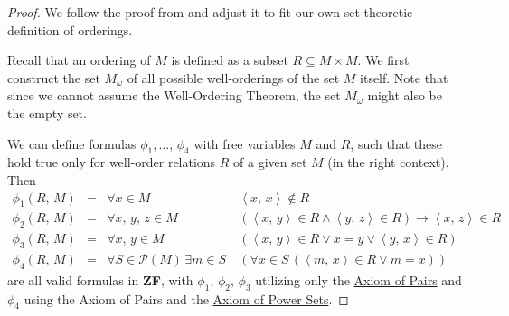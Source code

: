 \documentclass[../../main.tex]{subfiles}
\begin{document}
\begin{proof}
    We follow the proof from \cite{Har15} and adjust it to fit our own set-theoretic definition of orderings.

    Recall that an ordering of $M$ is defined as a subset $R \subseteq M \times M$.
    We first construct the set $M_\omega$ of all possible well-orderings of the set $M$ itself.
    Note that since we cannot assume the Well-Ordering Theorem, the set $M_\omega$ might also be the empty set.

    We can define formulas $\phi_1,\ldots,\, \phi_4$ with free variables $M$ and $R$, 
    such that these hold true only for well-order relations $R$ of a given set $M$ (in the right context).
    Then
    \begin{align*}
        \phi_1(R,\, M) &=& \forall x \in M \           & \left<x,\, x\right> \not\in R \\
        \phi_2(R,\, M) &=& \forall x,\, y,\, z \in M \ & \left(\left<x,\, y\right> \in R \wedge \left<y,\, z\right> \in R\right) \rightarrow \left<x,\, z\right> \in R \\
        \phi_3(R,\, M) &=& \forall x,\, y \in M \      & \left(\left<x,\, y\right> \in R \vee x = y \vee \left<y,\, x\right> \in R\right)\\
        \phi_4(R,\, M) &=& \forall S \in \mathcal{P}(M)\, \exists m \in S \
                         & \left(\forall x \in S\, \left(\left<m,\, x\right> \in R \vee m = x\right)\right)
    \end{align*}
    are all valid formulas in \textbf{ZF},
    with $\phi_1,\, \phi_2,\, \phi_3$ utilizing only the \hyperref[ZF2]{Axiom of Pairs} and $\phi_4$ using the Axiom of Pairs and the \hyperref[ZF6]{Axiom of Power Sets}.


\end{proof}
\end{document}
